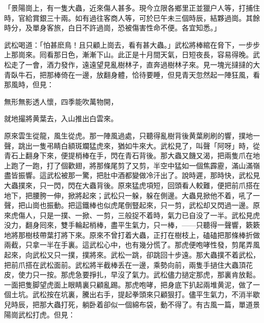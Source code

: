 \begin{myquote}[\markfont]
「景陽崗上，有一隻大蟲，近來傷人甚多。現今立限各鄉里正並獵户人等，打捕住時，官給賞銀三十兩。如有過往客商人等，可於巳午未三個時辰，結夥過崗。其餘時分，及單身客旅，白日不許過崗，恐被傷害性命不便。各宜知悉。」
\end{myquote}

武松喝道：「怕甚麽鳥！且只顧上崗去，看有甚大蟲。」武松將棒綰在脅下，一步步上那崗來。囘看那日色，漸漸下山。此正是十月間天氣，日短夜長，容易得晚。武松走了一會，酒力發作，遠遠望見亂樹林子，直奔過樹林子來。見一塊光撻撻的大青臥牛石，把那棒倚在一邊，放翻身體，恰待要睡，但見青天忽然起一陣狂風，看那風時，但見：

\begin{myquote}
無形無影透人懷，四季能吹萬物開，

就地撮將黄葉去，入山推出白雲來。
\end{myquote}

原來雲生從龍，風生從虎。那一陣風過處，只聽得亂樹背後黄葉刷刷的響，撲地一聲，跳出一隻弔睛白額斑斕猛虎來，猶如牛來大。武松見了，叫聲「阿呀」時，從青石上翻身下來，便提梢棒在手，閃在青石背後。那大蟲又饑又渴，把兩隻爪在地上跑了一跑，打了個歡翅，將那條尾剪了又剪，半空中猛如一個焦霹靂，滿山滿嶺盡皆振響。這武松被那一驚，把肚中酒都變做冷汗出了。說時遲，那時快，武松見大蟲撲來，只一閃，閃在大蟲背後。原來猛虎項短，回頭看人較難，便把前爪搭在地下，把腰胯一伸，掀將起來；武松只一躲，躲在側邊。大蟲見掀他不着，吼了一聲，把山崗也振動。把這鐵棒也似虎尾倒豎起來，只一剪，武松却又閃過一邊。原來虎傷人，只是一撲、一掀、一剪，三般捉不着時，氣力已自没了一半。武松見虎没力，翻身囘來，雙手輪起梢棒，盡平生氣力，只一棒，——只聽得一聲響，簌簌地將那樹枝帶葉打將下來。原來不曾打着大蟲，正打在樹枝上，磕磕把那條棒折做兩截，只拿一半在手裏。這武松心中，也有幾分慌了。那虎便咆哮性發，剪尾弄風起來，向武松又只一撲，撲將來。武松一跳，卻跳回十步遠。那大蟲撲不着武松，把前爪搭在武松面前。武松將半截棒丢在一邊，乘勢向前，兩隻手撾住大蟲頂花皮，使力只一按。那虎急要掙扎，早沒了氣力。武松儘力撾定那虎，那裏肯放鬆。一面把隻脚望虎面上眼睛裏只顧亂踢。那虎咆哮，把身底下扒起兩堆黄泥，做了一個土坑。武松按在坑裏，騰出右手，提起拳頭來只顧狠打。儘平生氣力，不消半歇兒時辰，把那大蟲打死，躺卧着卻似一個綿布袋，動不得了。有古風一篇，單道景陽崗武松打虎。但見：

